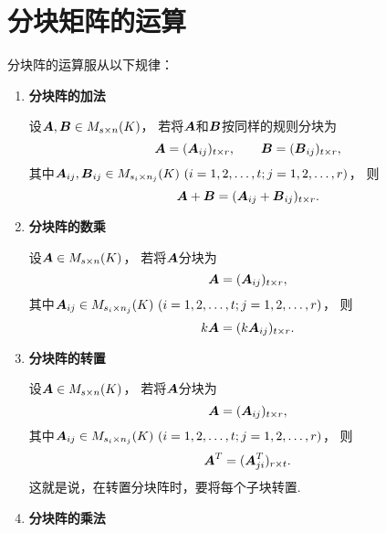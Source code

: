 \section{分块矩阵的运算}
分块阵的运算服从以下规律：
\begin{enumerate}
	\item {\rm\bf 分块阵的加法}

	设\(\boldsymbol{A},\boldsymbol{B} \in M_{s \times n}(K)\)，
	若将\(\boldsymbol{A}\)和\(\boldsymbol{B}\)按同样的规则分块为\[
		\boldsymbol{A}=(\boldsymbol{A}_{ij})_{t \times r}, \qquad
		\boldsymbol{B}=(\boldsymbol{B}_{ij})_{t \times r},
	\]
	其中\(\vb{A}_{ij},\vb{B}_{ij}\in M_{s_i \times n_j}(K)\ (i=1,2,\dotsc,t;j=1,2,\dotsc,r)\)，
	则\[
		\boldsymbol{A}+\boldsymbol{B}=(\boldsymbol{A}_{ij}+\boldsymbol{B}_{ij})_{t \times r}.
	\]

	\item {\rm\bf 分块阵的数乘}

	设\(\boldsymbol{A}\in M_{s \times n}(K)\)，
	若将\(\boldsymbol{A}\)分块为\[
		\boldsymbol{A}=(\boldsymbol{A}_{ij})_{t \times r},
	\]
	其中\(\vb{A}_{ij}\in M_{s_i \times n_j}(K)\ (i=1,2,\dotsc,t;j=1,2,\dotsc,r)\)，
	则\[
		k\boldsymbol{A}=(k\boldsymbol{A}_{ij})_{t \times r}.
	\]

	\item {\rm\bf 分块阵的转置}

	设\(\boldsymbol{A}\in M_{s \times n}(K)\)，
	若将\(\boldsymbol{A}\)分块为\[
		\boldsymbol{A}=(\boldsymbol{A}_{ij})_{t \times r},
	\]
	其中\(\vb{A}_{ij}\in M_{s_i \times n_j}(K)\ (i=1,2,\dotsc,t;j=1,2,\dotsc,r)\)，
	则\[
		\boldsymbol{A}^T=(\boldsymbol{A}_{ji}^T)_{r \times t}.
	\]
	这就是说，在转置分块阵时，要将每个子块转置.

	\item {\rm\bf 分块阵的乘法}


\end{enumerate}

